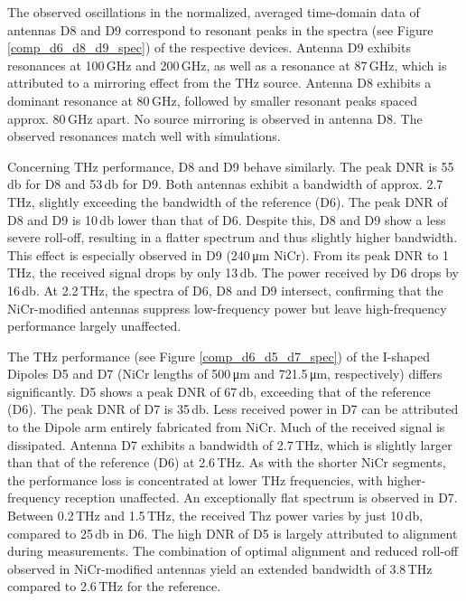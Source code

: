 The observed oscillations in the normalized, averaged time-domain data of antennas D8 and D9 correspond to resonant peaks in the spectra (see Figure \ref{comp_d6_d8_d9_spec}) of the respective devices. Antenna D9 exhibits resonances at \num{100}\,\si{\giga \hertz} and \num{200}\,\si{\giga \hertz}, as well as a resonance at \num{87}\,\si{\giga \hertz}, which is attributed to a mirroring effect from the THz source. Antenna D8 exhibits a dominant resonance at \num{80}\,\si{\giga \hertz}, followed by smaller resonant peaks spaced approx. \num{80}\,\si{\giga \hertz} apart. No source mirroring is observed in antenna D8. The observed resonances match well with simulations.

Concerning THz performance, D8 and D9 behave similarly. The peak DNR is \num{55}\,\si{\decibel} for D8 and \num{53}\,\si{\decibel} for D9. Both antennas exhibit a bandwidth of approx. \num{2.7}\,\si{\tera \hertz}, slightly exceeding the bandwidth of the reference (D6). The peak DNR of D8 and D9 is \num{10}\,\si{\decibel} lower than that of D6. Despite this, D8 and D9 show a less severe roll-off, resulting in a flatter spectrum and thus slightly higher bandwidth. This effect is especially observed in D9 (\num{240}\,\si{\micro \meter} NiCr). From its peak DNR to \num{1}\,\si{\tera \hertz}, the received signal drops by only \num{13}\,\si{\decibel}. The power received by D6 drops by \num{16}\,\si{\decibel}. At \num{2.2}\,\si{\tera \hertz}, the spectra of D6, D8 and D9 intersect, confirming that the NiCr-modified antennas suppress low-frequency power but leave high-frequency performance largely unaffected.

The THz performance (see Figure \ref{comp_d6_d5_d7_spec}) of the I-shaped Dipoles D5 and D7 (NiCr lengths of \num{500}\,\si{\micro \meter} and \num{721.5}\,\si{\micro \meter}, respectively) differs significantly. D5 shows a peak DNR of \num{67}\,\si{\decibel}, exceeding that of the reference (D6). The peak DNR of D7 is \num{35}\,\si{\decibel}. Less received power in D7 can be attributed to the Dipole arm entirely fabricated from NiCr. Much of the received signal is dissipated. Antenna D7 exhibits a bandwidth of \num{2.7}\,\si{\tera \hertz}, which is slightly larger than that of the reference (D6) at \num{2.6}\,\si{\tera \hertz}. As with the shorter NiCr segments, the performance loss is concentrated at lower THz frequencies, with higher-frequency reception unaffected. An exceptionally flat spectrum is observed in D7. Between \num{0.2}\,\si{\tera \hertz} and \num{1.5}\,\si{\tera \hertz}, the received Thz power varies by just \num{10}\,\si{\decibel}, compared to \num{25}\,\si{\decibel} in D6. The high DNR of D5 is largely attributed to alignment during measurements. The combination of optimal alignment and reduced roll-off observed in NiCr-modified antennas yield an extended bandwidth of \num{3.8}\,\si{\tera \hertz} compared to \num{2.6}\,\si{\tera \hertz} for the reference. 


